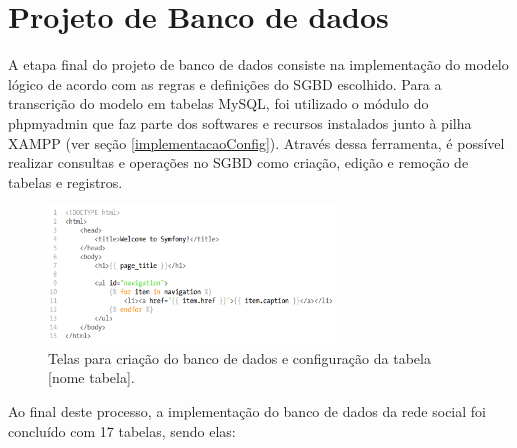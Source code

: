 \section{Projeto de Banco de dados}
\label{metodologiaBD}

A etapa final do projeto de banco de dados consiste na implementação do modelo lógico de acordo com as regras e definições do SGBD escolhido. Para a transcrição do modelo em tabelas MySQL, foi utilizado o módulo do phpmyadmin que faz parte dos softwares e recursos instalados junto à pilha XAMPP (ver seção \ref{implementacaoConfig}). Através dessa ferramenta, é possível realizar consultas e  operações no SGBD como criação, edição e remoção de tabelas e registros.

\begin{figure}[h]
    \begin{adjustwidth}{-1in}{-.8in}
        \begin{center}
            \includegraphics[width=0.68\textwidth]{figuras/twig-symf.png}
        \end{center}
        \caption{Telas para criação do banco de dados e configuração da tabela [nome tabela].}
        \label{projetoImagens}
    \end{adjustwidth}
\end{figure}

Ao final deste processo, a implementação do banco de dados da rede social foi concluído com 17 tabelas, sendo elas:

